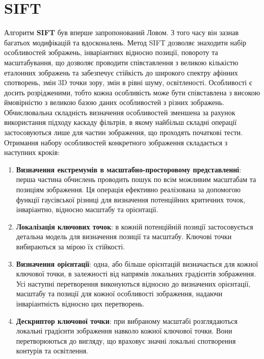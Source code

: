 \chapter{SIFT}
Алгоритм \textbf{SIFT} був вперше запропонований Ловом\cite{Lowe2004}. З того часу він зазнав багатьох модифікацій та вдосконалень. Метод SIFT дозволяє знаходити набір особливостей зображень, інваріантних відносно позиції, повороту та масштабування, що дозволяє проводити співставлення з великою кількістю еталонних зображень та забезпечує стійкість до широкого спектру афінних спотворень, змін 3D точки зору, змін в рівні шуму, освітленості. Особливості є досить розрідженими, тобто кожна особливість може бути співставлена з високою ймовірністю з великою базою даних особливостей з різних зображень. Обчислювальна складність визначення особливостей зменшена за рахунок використання підходу каскаду фільтрів, в якому найбільш складні операції застосовуються лише для частин зображення, що проходять початкові тести. Отримання набору особливостей конкретного зображення складається з наступних кроків:

\begin{enumerate}

\item \textbf{Визначення екстремумів в масштабно-просторовому представленні}: перша частина обчислень проводить пошук по всім можливим масштабам та позиціям зображення. Ця операція ефективно реалізована за допомогою функції гаусівської різниці для визначення потенційних критичних точок, інваріантно, відносно масштабу та орієнтації.

\item \textbf{Локалізація ключових точок}: в кожній потенційній позиції застосовується детальна модель для визначення позиції та масштабу. Ключові точки вибираються за мірою їх стійкості.

\item \textbf{Визначення орієнтації}: одна, або більше орієнтацій визначається для кожної ключової точки, в залежності від напрямів локальних градієнтів зображення. Усі наступні перетворення виконуються відносно до визначених орієнтації, масштабу та позиції для кожної особливості зображення, надаючи інваріантність відносно цих перетворень.

\item \textbf{Дескриптор ключової точки}: при вибраному масштабі розглядаються локальні градієнти зображення навколо кожної ключової точки. Вони перетворюються до вигляду, що враховує значні локальні спотворення контурів та освітлення.

\end{enumerate}

